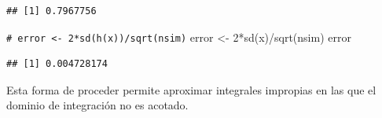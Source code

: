 \documentclass[
]{book}
\newenvironment{Shaded}{\begin{snugshade}}{\end{snugshade}}
\newcommand{\CommentTok}[1]{\textcolor[rgb]{0.56,0.35,0.01}{\textit{#1}}}
\newcommand{\DecValTok}[1]{\textcolor[rgb]{0.00,0.00,0.81}{#1}}
\newcommand{\FunctionTok}[1]{\textcolor[rgb]{0.00,0.00,0.00}{#1}}
\newcommand{\NormalTok}[1]{#1}
\newcommand{\OtherTok}[1]{\textcolor[rgb]{0.56,0.35,0.01}{#1}}
\newcommand{\SpecialCharTok}[1]{\textcolor[rgb]{0.00,0.00,0.00}{#1}}
\theoremstyle{break}
\theoremstyle{nonumberplain}
\renewcommand{\CommentTok}[1]{\textcolor[rgb]{0.41,0.41,0.41}{\texttt{#1}}}
\begin{document}
\begin{verbatim}
## [1] 0.7967756
\end{verbatim}

\begin{Shaded}
\begin{Highlighting}[]
\CommentTok{\# error \textless{}{-} 2*sd(h(x))/sqrt(nsim)}
\NormalTok{error }\OtherTok{\textless{}{-}} \DecValTok{2}\SpecialCharTok{*}\FunctionTok{sd}\NormalTok{(x)}\SpecialCharTok{/}\FunctionTok{sqrt}\NormalTok{(nsim)}
\NormalTok{error}
\end{Highlighting}
\end{Shaded}

\begin{verbatim}
## [1] 0.004728174
\end{verbatim}

Esta forma de proceder permite aproximar integrales impropias en las que el dominio de integración no es acotado.
\end{document}
